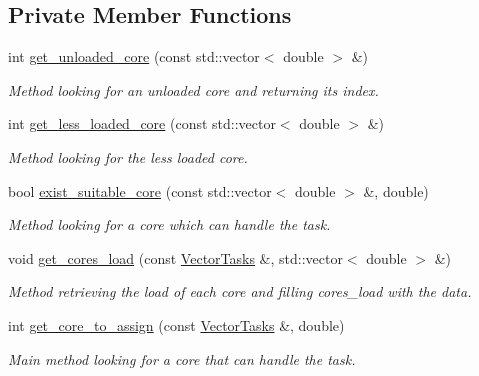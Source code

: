\subsection*{Private Member Functions}
\begin{DoxyCompactItemize}
\item 
int \hyperlink{classParallelScheduler_a3a3bd8e72a7dbc83986cf31918569fd3}{get\-\_\-unloaded\-\_\-core} (const std\-::vector$<$ double $>$ \&)
\begin{DoxyCompactList}\small\item\em Method looking for an unloaded core and returning its index. \end{DoxyCompactList}\item 
int \hyperlink{classParallelScheduler_ad58ae6d78d6920e548d7c6c956fa3caa}{get\-\_\-less\-\_\-loaded\-\_\-core} (const std\-::vector$<$ double $>$ \&)
\begin{DoxyCompactList}\small\item\em Method looking for the less loaded core. \end{DoxyCompactList}\item 
bool \hyperlink{classParallelScheduler_af52a8e359a4134fec49db090781caf8b}{exist\-\_\-suitable\-\_\-core} (const std\-::vector$<$ double $>$ \&, double)
\begin{DoxyCompactList}\small\item\em Method looking for a core which can handle the task. \end{DoxyCompactList}\item 
void \hyperlink{classParallelScheduler_a7925556ff7ab1b4746a72709b24f157e}{get\-\_\-cores\-\_\-load} (const \hyperlink{ParallelScheduler_8h_ac7eb1fba35a2c780a99ff2d3df789884}{Vector\-Tasks} \&, std\-::vector$<$ double $>$ \&)
\begin{DoxyCompactList}\small\item\em Method retrieving the load of each core and filling cores\-\_\-load with the data. \end{DoxyCompactList}\item 
int \hyperlink{classParallelScheduler_ad71e8b952aee7b123c612540564fa090}{get\-\_\-core\-\_\-to\-\_\-assign} (const \hyperlink{ParallelScheduler_8h_ac7eb1fba35a2c780a99ff2d3df789884}{Vector\-Tasks} \&, double)
\begin{DoxyCompactList}\small\item\em Main method looking for a core that can handle the task. \end{DoxyCompactList}\end{DoxyCompactItemize}
